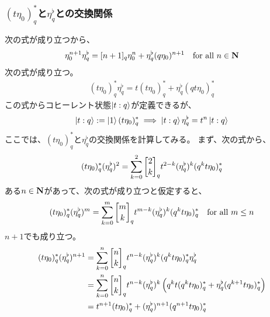 {\subsubsection{$(t\eta_0)_q^*$と$\eta_q^\flat$との交換関係} %
	次の式が成り立つから、
	\begin{equation*}\begin{split}
		\eta_0^{n+1}\eta_q^\flat 
		= [n+1]_q\eta_0^n + \eta_q^\flat(q\eta_0)^{n+1}
		\quad\text{for all } n\in\mathbf{N}
	\end{split}\end{equation*}
	次の式が成り立つ。
	\begin{equation*}\begin{split}
		(t\eta_0)_q^*\eta_q^\flat = t(t\eta_0)_q^* + \eta_q^\flat(qt\eta_0)_q^*
	\end{split}\end{equation*}
	この式からコヒーレント状態$\mathinner{|{t:q}\rangle}$が定義できるが、
	\begin{equation*}\begin{split}
		\mathinner{|{t:q}\rangle} := \mathinner{|{1}\rangle}(t\eta_0)_q^*
		\implies \mathinner{|{t:q}\rangle}\eta_q^\flat = t^n\mathinner{|{t:q}\rangle}
	\end{split}\end{equation*}
	ここでは、$(t\eta_0)_q^*$と$\eta_q^\flat$の交換関係を計算してみる。
	まず、次の式から、
	\begin{equation*}\begin{split}
		(t\eta_0)_q^*(\eta_q^\flat)^2 
		= \sum_{k=0}^2 \qbinom{2}{k}_qt^{2-k}(\eta_q^\flat)^k(q^kt\eta_0)_q^*
	\end{split}\end{equation*}
	ある$n\in\mathbf{N}$があって、次の式が成り立つと仮定すると、
	\begin{equation*}\begin{split}
		(t\eta_0)_q^*(\eta_q^\flat)^m
		= \sum_{k=0}^m \qbinom{m}{k}_qt^{m-k}(\eta_q^\flat)^k(q^kt\eta_0)_q^*
		\quad\text{for all } m\le n
	\end{split}\end{equation*}
	$n+1$でも成り立つ。
	\begin{equation*}\begin{split}
		(t\eta_0)_q^*(\eta_q^\flat)^{n+1}
		&= \sum_{k=0}^n \qbinom{n}{k}_qt^{n-k}(\eta_q^\flat)^k(q^kt\eta_0)_q^*
			\eta_q^\flat \\
		&= \sum_{k=0}^n \qbinom{n}{k}_qt^{n-k}(\eta_q^\flat)^k
			\ggplr{q^kt(q^kt\eta_0)_q^* + \eta_q^\flat(q^{k+1}t\eta_0)_q^*} \\
		&= t^{n+1}(t\eta_0)_q^* + (\eta_q^\flat)^{n+1}(q^{n+1}t\eta_0)_q^* \\

\end{split}
\end{equation*}}
